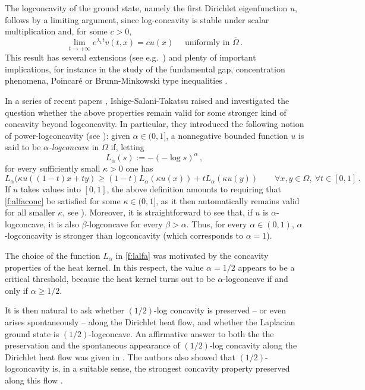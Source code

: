 \documentclass[11pt]{amsart}
\theoremstyle{definition}
\theoremstyle{remark}
\def\Om{\Omega}
\def\k{\kappa}
\begin{document}
The logconcavity of the ground state, namely the first Dirichlet eigenfunction $u$,  follows by a limiting argument, since
 log-concavity is stable under scalar multiplication and, for some $c>0$, 
 $$\lim _{ t \to + \infty} e ^ { \lambda _ 1 t} v  ( t, x) = c u ( x)  \quad \text{  uniformly in  }  \overline \Om\,.$$
This result has several extensions (see e.g.\ \cite{Sak,  BS09, CF20, CFrobin, Col25}) and plenty of  important implications, for instance in the study of the fundamental gap, concentration phenomena,  Poincar\'e or Brunn-Minkowski type inequalities  
\cite{ABF1, AC11,  BorBM, Col2005, ledoux}.   



In a series of recent papers \cite{IST20,IST22,IST24}, Ishige-Salani-Takatsu raised and investigated  the question whether the above properties remain valid for some stronger kind of concavity beyond logconcavity. 
In particular, they introduced the following notion of power-logconcavity  (see \cite[Definition 2.1]{IST20}):
given $\alpha \in (0, 1]$, a nonnegative bounded function $u$ is said to be {\it $\alpha$-logconcave}  in $\Om$  if, letting 
\begin{equation}\label{f:lalfa} 
L _\alpha (s):=   - ( - \log s ) ^{\alpha} \,,
\end{equation} 
for every  sufficiently small $\k>0$ one has
\begin{equation}\label{f:alfaconc} L _\alpha (\k u ( ( 1-t )  x + t   y) \geq ( 1-t ) L _\alpha (\k u (x)) + t L _\alpha (\k u (y))
 \qquad \forall x, y \in \Om, \ \forall t \in [0, 1]\, .
\end{equation}   
If $u$ takes values into $[0, 1]$, the above definition amounts to requiring that 
\eqref{f:alfaconc} be satisfied  for some $\k \in (0, 1]$, as it then automatically remains valid for all smaller $\k$, see \cite[Lemma 2.1]{IST20}). 
Moreover, it is straightforward to see that, if $u$ is $\alpha$-logconcave, it is also $\beta$-logconcave  for every $\beta>\alpha$. 
Thus, for every $\alpha \in (0, 1)$, $\alpha$-logconcavity is stronger than logconcavity (which corresponds to $\alpha = 1$). 

The  choice of the function $L _\alpha$ in \eqref{f:lalfa} was motivated by the concavity properties of the heat kernel. In  this respect, 
the value $\alpha = 1/2$ appears to be a critical threshold, because the heat kernel turns out to be $\alpha$-logconcave if and only if 
$\alpha \geq 1/2$. 

It is then natural to ask whether $(1/2)$-log concavity is preserved -- or even arises spontaneously --  along the Dirichlet heat flow, and whether the 
Laplacian ground state is $(1/2)$-logconcave. 
An affirmative answer to both the  the preservation and the spontaneous appearance of $(1/2)$-log concavity along the Dirichlet heat flow was given in \cite[Corollary 3.1 and Theorem 3.3]{IST20}. The authors also showed that $(1/2)$-logconcavity is, in a suitable sense,  the strongest concavity property preserved along this flow \cite[Theorem 3.2]{IST20}. 
\end{document}

